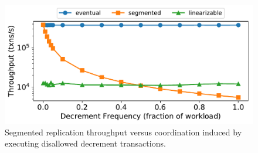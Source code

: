 \begin{figure}[t]
  \centering
  \includegraphics[width=\columnwidth]{figures/throughput_vs_fraction_16.pdf}
  \caption{%
    Segmented \invariantconfluent{} replication throughput versus coordination
    induced by executing disallowed decrement transactions.
  }
\end{figure}

